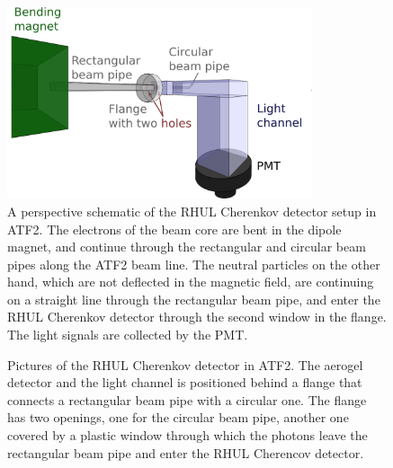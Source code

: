 \begin{figure}
\centering
\includegraphics[width=0.8\textwidth]{Figures/drawing_CherenkovSetup.png}
\caption[Schematic drawing of the RHUL Cherenkov detector setup]{A perspective schematic of the RHUL Cherenkov detector setup in ATF2. The electrons of the beam core are bent in the dipole magnet, and continue through the rectangular and circular beam pipes along the ATF2 beam line. The neutral particles on the other hand, which are not deflected in the magnetic field, are continuing on a straight line through the rectangular beam pipe, and enter the RHUL Cherenkov detector through the second window in the flange. The light signals are collected by the PMT.}
\label{fig:RHUL_Cherenkov_Drawing}
\end{figure}

\begin{figure}
\begin{center}
\caption[Pictures of the RHUL Cherenkov detector]{Pictures of the RHUL Cherenkov detector in ATF2. The aerogel detector and the light channel is positioned behind a flange that connects a rectangular beam pipe with a circular one. The flange has two openings, one for the circular beam pipe, another one covered by a plastic window through which the photons leave the rectangular beam pipe and enter the RHUL Cherencov detector.}
\label{fig:RHUL_Cherenkov}
\end{center}
\end{figure}

